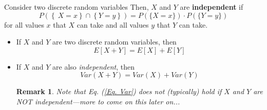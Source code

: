 \documentclass[smaller, handout]{beamer}\usepackage[]{graphicx}\usepackage[]{color}
\newtheorem{remark}{Remark}[section]
\newenvironment{stepitemize}{\begin{itemize}[<+->]}{\end{itemize} }
\begin{document}
\begin{frame}{\secname}
  \begin{definition}
  Consider two discrete random variables
  \medskip
  Then, $X$ and $Y$ are \textbf{independent} if%
  \begin{equation*}
  P \left(\left\{ \ X=x\right\} \cap \left\{ Y=y\right\} \right) =P \left(\{
  X=x\}\right) \cdot P \left(\{ Y=y \}\right)
  \end{equation*}
  for all values $x$ that $X$ can take and all values $y$ that $Y$ can take.
  \end{definition}
\end{frame}%

\begin{frame}{\secname}%


\begin{stepitemize}
\item If $X$ and $Y$ are two discrete random variables, then%
\begin{equation*}
E\left[ X+Y\right] =E\left[ X\right] +E\left[ Y\right]
\end{equation*}

\item If $X$ and $Y$ are also \emph{independent}, then%
\begin{equation}
Var\left( X+Y\right) =Var\left( X\right) +Var\left( Y\right) \label{Eq. Var}
\end{equation}

\begin{remark}
Note that Eq. (\ref{Eq. Var})  does not (typically) hold if $X$ and $Y$ are NOT independent---more to come on this later on...
\end{remark}
\end{stepitemize}

\end{frame}%
\end{document}
